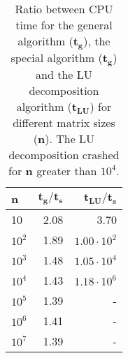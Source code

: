 \begin{table}[htbp]
	\centering
	\begin{tabular}{lrr}
		\textbf{n} & $\mathbf{{t_g}/{t_s}}$ & $\mathbf{{t_{LU}}/{t_s}}$  \\
		\midrule
		\addlinespace[0.1cm]
		
		10         & 2.08                                                                                          & 3.70                                                                                        \\
		$10^2$       & 1.89                                                                                          & $1.00\cdot 10^2 $                                                                                         \\
		$10^3$       & 1.48                                                                                          & $1.05 \cdot 10^4 $                                                                                        \\
		$10^4$       & 1.43                                                                                          & $1.18 \cdot 10^6$                                                                                         \\
		$10^5$       & 1.39                                                                                          & -                                                                                         \\
		$10^6$       & 1.41                                                                                          & -                                                                                        \\
		$10^7$       & 1.39                                                                                          &    -                                                                                    
	\end{tabular}  \caption{Ratio between CPU time for the general algorithm ($\mathbf{t_g}$), the special algorithm ($\mathbf{t_g}$) and the LU decomposition algorithm ($\mathbf{t_{LU}}$) for different matrix sizes (\textbf{n}). The LU decomposition crashed for \textbf{n} greater than $10^4$.} \label{table:time}
\end{table} 